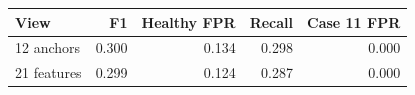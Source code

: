 \begin{tabular}{lrrrr}
\toprule
View & F1 & Healthy FPR & Recall & Case 11 FPR \\
\midrule
12 anchors & 0.300 & 0.134 & 0.298 & 0.000 \\
21 features & 0.299 & 0.124 & 0.287 & 0.000 \\
\bottomrule
\end{tabular}
